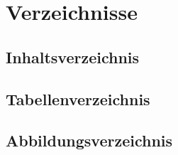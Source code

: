 \section{Verzeichnisse}
\subsection{Inhaltsverzeichnis}
\subsection{Tabellenverzeichnis}
\subsection{Abbildungsverzeichnis}